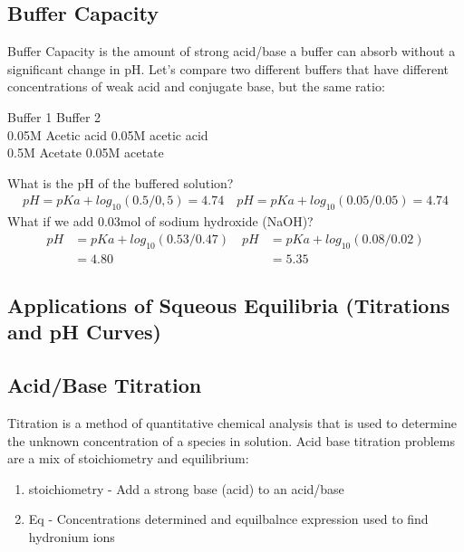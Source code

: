 \documentclass[../CHEM152Notes.tex]{subfiles}
\begin{document}
\subsection*{Buffer Capacity}
Buffer Capacity is the amount of strong acid/base a buffer can absorb without a significant change in pH. 
\newline
Let's compare two different buffers that have different concentrations of weak acid and conjugate base, but the same ratio:
\begin{center}
    Buffer 1 \quad Buffer 2 \\
    0.05M Acetic acid \quad 0.05M acetic acid \\
    0.5M Acetate \quad 0.05M acetate
\end{center}
What is the pH of the buffered solution?
\begin{equation*}
    \begin{aligned}
        pH  = pKa + log_{10}(0.5/0,5) = 4.74 \quad pH  = pKa + log_{10}(0.05/0.05) = 4.74
    \end{aligned}
\end{equation*}
What if we add 0.03mol of sodium hydroxide (NaOH)?
\begin{equation*}
    \begin{aligned}
        pH  &= pKa + log_{10}(0.53/0.47) \quad pH  &= pKa + log_{10}(0.08/0.02) \\
        &= 4.80 \quad &= 5.35
    \end{aligned}
\end{equation*} %

\subsection*{Applications of Squeous Equilibria (Titrations and pH Curves)}

\subsection*{Acid/Base Titration}
Titration is a method of quantitative chemical analysis that is used to determine the unknown concentration of a species in solution. 
\newline
Acid base titration problems are a mix of stoichiometry and equilibrium:
\begin{enumerate}
    \item stoichiometry - Add a strong base (acid) to an acid/base
    \item Eq - Concentrations determined and equilbalnce expression used to find hydronium ions
\end{enumerate}
\end{document}
